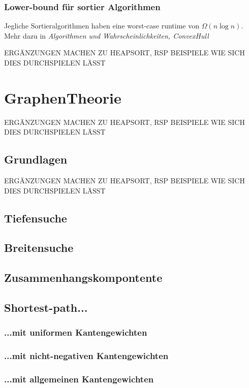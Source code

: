 \documentclass[a4paper]{article}
\begin{document}
     
    \subsubsection{Lower-bound für sortier Algorithmen}
    Jegliche Sortieralgorithmen haben eine worst-case runtime von $\Omega(n \log n)$. Mehr dazu in \textit{Algorithmen und Wahrscheinlichkeiten, ConvexHull}
        
        


ERGÄNZUNGEN MACHEN ZU HEAPSORT, RSP BEISPIELE WIE SICH DIES DURCHSPIELEN LÄSST
\section{GraphenTheorie}
ERGÄNZUNGEN MACHEN ZU HEAPSORT, RSP BEISPIELE WIE SICH DIES DURCHSPIELEN LÄSST
\subsection{Grundlagen}
ERGÄNZUNGEN MACHEN ZU HEAPSORT, RSP BEISPIELE WIE SICH DIES DURCHSPIELEN LÄSST
\subsection{Tiefensuche}
    
\subsection{Breitensuche}
    
\subsection{Zusammenhangskompontente}
    
\subsection{Shortest-path...}
    
\subsubsection{...mit uniformen Kantengewichten}
    
\subsubsection{...mit nicht-negativen Kantengewichten}
    
\subsubsection{...mit allgemeinen Kantengewichten}
    
\end{document}
